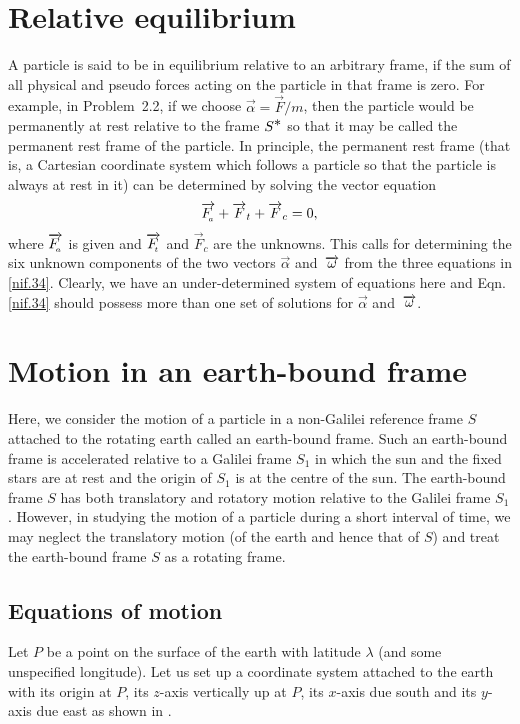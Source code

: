 \section{Relative equilibrium}
 A particle 
is said to be {in equilibrium relative to an arbitrary 
frame}, if the sum of all physical and  pseudo forces 
acting 
on the particle in that frame is zero. For example, in 
Problem~2.2, if we choose $\vec{\alpha} = \vec{F}/m $, then 
the particle would be {permanently at rest} relative to the 
frame $S^{\textstyle \ast}$ so that it may be called the {permanent rest 
frame} of the particle. In principle, the permanent rest 
frame (that is, a Cartesian coordinate system which follows 
a particle so that the particle is always at rest in it) 
can 
be determined by solving the vector equation
\begin{align}\label{nif.34}
\overrightarrow{F_{{_{\hspace*{-1.5pt}{a}}}}}+ \overrightarrow{F}_{t} +
\overrightarrow{F}_{c}=0,
\end{align}
where $\overrightarrow{F_{{_{\hspace*{-1.5pt}{a}}}}}$ is given and $\overrightarrow{F_{{_{\hspace*{-1.5pt}{t}}}}}$ 
and 
$\vec{F}_{c}$ are the unknowns. This calls for determining 
the six unknown components of the two vectors 
$\vec{\alpha}$ 
and $\,\overrightarrow{{\omega}}$ from the three equations in 
\eqref{nif.34}. Clearly, we have an {under-determined} 
system of equations here and Eqn.\eqref{nif.34} should 
possess 
more than one set of solutions for $\vec{\alpha}$ and 
$\,\overrightarrow{{\omega}}$.

\vspace{-.3cm}

\section{Motion in an earth-bound frame}
Here, we consider the motion of a particle in a non-Galilei 
reference frame $S$ attached to the rotating earth called 
an 
earth-bound frame. Such an earth-bound frame is accelerated 
relative to a Galilei frame $ S_1 $ in which the sun and 
the 
fixed stars are at rest and the origin of $ S_1 $ is at the 
centre of the sun. The earth-bound frame $S$ has both 
translatory and rotatory motion relative to the Galilei 
frame $ S_1 $. However, in studying the motion of a 
particle 
during a short interval of time, we may neglect the 
translatory motion (of the earth and hence that of $S$) and 
treat the earth-bound frame $S $ as a rotating frame.

\vspace{-.3cm}

\subsection{Equations of motion}
 Let 
$P$ be a point on the surface of the earth with latitude $ 
\lambda $ (and some unspecified longitude). Let us set up a 
coordinate system attached to the earth with its origin at 
$P $, its $z$-axis vertically up at $P$, its $ x $-axis due 
south and its $ y $-axis due east as shown in 
. 

